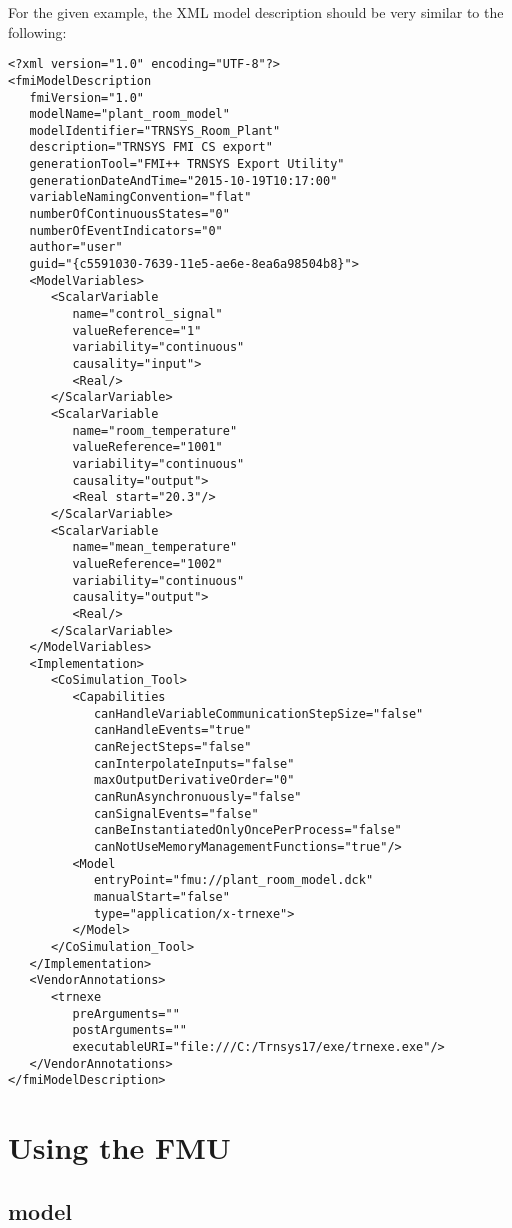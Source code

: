 For the given example, the XML model description should be very similar to the following:
\begin{verbatim}
<?xml version="1.0" encoding="UTF-8"?>
<fmiModelDescription
   fmiVersion="1.0"
   modelName="plant_room_model"
   modelIdentifier="TRNSYS_Room_Plant"
   description="TRNSYS FMI CS export"
   generationTool="FMI++ TRNSYS Export Utility"
   generationDateAndTime="2015-10-19T10:17:00"
   variableNamingConvention="flat"
   numberOfContinuousStates="0"
   numberOfEventIndicators="0"
   author="user"
   guid="{c5591030-7639-11e5-ae6e-8ea6a98504b8}">
   <ModelVariables>
      <ScalarVariable
         name="control_signal"
         valueReference="1"
         variability="continuous"
         causality="input">
         <Real/>
      </ScalarVariable>
      <ScalarVariable
         name="room_temperature"
         valueReference="1001"
         variability="continuous"
         causality="output">
         <Real start="20.3"/>
      </ScalarVariable>
      <ScalarVariable
         name="mean_temperature"
         valueReference="1002"
         variability="continuous"
         causality="output">
         <Real/>
      </ScalarVariable>
   </ModelVariables>
   <Implementation>
      <CoSimulation_Tool>
         <Capabilities
            canHandleVariableCommunicationStepSize="false"
            canHandleEvents="true"
            canRejectSteps="false"
            canInterpolateInputs="false"
            maxOutputDerivativeOrder="0"
            canRunAsynchronuously="false"
            canSignalEvents="false"
            canBeInstantiatedOnlyOncePerProcess="false"
            canNotUseMemoryManagementFunctions="true"/>
         <Model
            entryPoint="fmu://plant_room_model.dck"
            manualStart="false"
            type="application/x-trnexe">
         </Model>
      </CoSimulation_Tool>
   </Implementation>
   <VendorAnnotations>
      <trnexe
         preArguments=""
         postArguments=""
         executableURI="file:///C:/Trnsys17/exe/trnexe.exe"/>
   </VendorAnnotations>
</fmiModelDescription>
\end{verbatim}

\section{Using the FMU}

\subsection{\dymola model}

